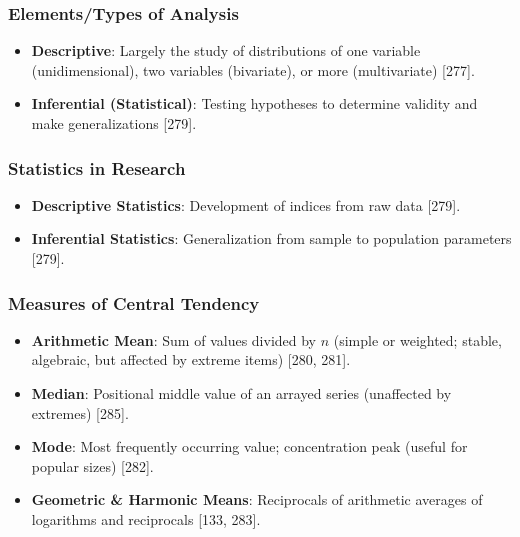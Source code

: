 \documentclass[
]{article}
\providecommand{\tightlist}{%
  \setlength{\itemsep}{0pt}\setlength{\parskip}{0pt}}
\begin{document}
\subsubsection{Elements/Types of
Analysis}\label{elementstypes-of-analysis}

\begin{itemize}
\tightlist
\item
  \textbf{Descriptive}: Largely the study of distributions of one
  variable (unidimensional), two variables (bivariate), or more
  (multivariate) {[}277{]}.
\item
  \textbf{Inferential (Statistical)}: Testing hypotheses to determine
  validity and make generalizations {[}279{]}.
\end{itemize}

\subsubsection{Statistics in Research}\label{statistics-in-research}

\begin{itemize}
\tightlist
\item
  \textbf{Descriptive Statistics}: Development of indices from raw data
  {[}279{]}.
\item
  \textbf{Inferential Statistics}: Generalization from sample to
  population parameters {[}279{]}.
\end{itemize}

\subsubsection{Measures of Central
Tendency}\label{measures-of-central-tendency}

\begin{itemize}
\tightlist
\item
  \textbf{Arithmetic Mean}: Sum of values divided by \(n\) (simple or
  weighted; stable, algebraic, but affected by extreme items) {[}280,
  281{]}.
\item
  \textbf{Median}: Positional middle value of an arrayed series
  (unaffected by extremes) {[}285{]}.
\item
  \textbf{Mode}: Most frequently occurring value; concentration peak
  (useful for popular sizes) {[}282{]}.
\item
  \textbf{Geometric \& Harmonic Means}: Reciprocals of arithmetic
  averages of logarithms and reciprocals {[}133, 283{]}.
\end{itemize}
\end{document}
